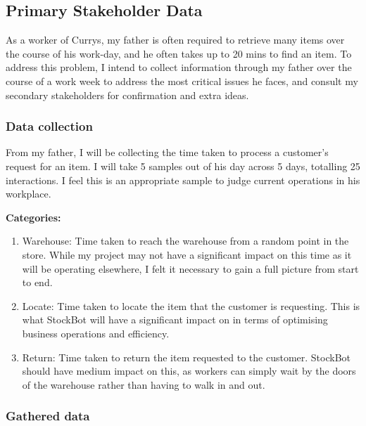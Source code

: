 \subsection{Primary Stakeholder Data}

As a worker of Currys, my father is often required to retrieve many items over the course of his work-day, and he often takes up to 20 mins to find an item. To address this problem, I intend to collect information through my father over the course of a work week to address the most critical issues he faces, and consult my secondary stakeholders for confirmation and extra ideas.

\subsubsection{Data collection}

From my father, I will be collecting the time taken to process a customer's request for an item. I will take 5 samples out of his day across 5 days, totalling 25 interactions. I feel this is an appropriate sample to judge current operations in his workplace. \newline

\textbf{Categories:}

\begin{enumerate}
    \item Warehouse: Time taken to reach the warehouse from a random point in the store. While my project may not have a significant impact on this time as it will be operating elsewhere, I felt it necessary to gain a full picture from start to end.

    \item Locate: Time taken to locate the item that the customer is requesting. This is what StockBot will have a significant impact on in terms of optimising business operations and efficiency.

    \item Return: Time taken to return the item requested to the customer. StockBot should have medium impact on this, as workers can simply wait by the doors of the warehouse rather than having to walk in and out.
\end{enumerate}

\subsubsection{Gathered data}

